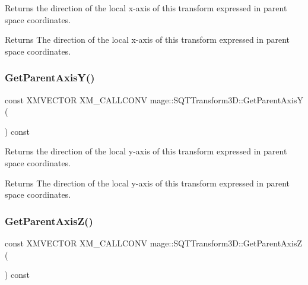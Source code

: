 Returns the direction of the local x-\/axis of this transform expressed in parent space coordinates.

\begin{DoxyReturn}{Returns}
The direction of the local x-\/axis of this transform expressed in parent space coordinates. 
\end{DoxyReturn}
\mbox{\label{classmage_1_1_s_q_t_transform3_d_a08ad3d7fb3443a83767a8ec0c09706a3}} 
\subsubsection{\texorpdfstring{Get\+Parent\+Axis\+Y()}{GetParentAxisY()}}
{\footnotesize\ttfamily const X\+M\+V\+E\+C\+T\+OR X\+M\+\_\+\+C\+A\+L\+L\+C\+O\+NV mage\+::\+S\+Q\+T\+Transform3\+D\+::\+Get\+Parent\+AxisY (\begin{DoxyParamCaption}{ }\end{DoxyParamCaption}) const\hspace{0.3cm}{\ttfamily [noexcept]}}

Returns the direction of the local y-\/axis of this transform expressed in parent space coordinates.

\begin{DoxyReturn}{Returns}
The direction of the local y-\/axis of this transform expressed in parent space coordinates. 
\end{DoxyReturn}
\mbox{\label{classmage_1_1_s_q_t_transform3_d_aa78fb45f9bf9972ff183030b592de719}} 
\subsubsection{\texorpdfstring{Get\+Parent\+Axis\+Z()}{GetParentAxisZ()}}
{\footnotesize\ttfamily const X\+M\+V\+E\+C\+T\+OR X\+M\+\_\+\+C\+A\+L\+L\+C\+O\+NV mage\+::\+S\+Q\+T\+Transform3\+D\+::\+Get\+Parent\+AxisZ (\begin{DoxyParamCaption}{ }\end{DoxyParamCaption}) const\hspace{0.3cm}{\ttfamily [noexcept]}}

